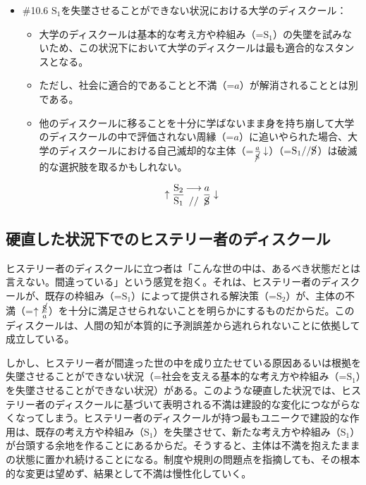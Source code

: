 \begin{note}{}
  \begin{itemize}
    \tightlist
    \item{\#10.6} $\textrm{S}_1$を失墜させることができない状況における大学のディスクール：
      \begin{itemize}
        \tightlist
        \item 大学のディスクールは基本的な考え方や枠組み（=$\textrm{S}_1$）の失墜を試みないため、この状況下において大学のディスクールは最も適合的なスタンスとなる。
        \item ただし、社会に適合的であることと不満（=$a$）が解消されることとは別である。
        \item 他のディスクールに移ることを十分に学ばないまま身を持ち崩して大学のディスクールの中で評価されない周縁（=$a$）に追いやられた場合、大学のディスクールにおける自己滅却的な主体（=$\frac{a}{\cancel{\textrm{S}}}\downarrow$）（=$\textrm{S}_1//\cancel{\textrm{S}}$）は破滅的な選択肢を取るかもしれない。
      \end{itemize}

$$
\uparrow\frac{\mathrm{S_2}}{\mathrm{S_1}}\genfrac{}{}{0pt}{}{\longrightarrow}{//}\frac{a}{\cancel{\textrm{S}}}\downarrow
$$
  \end{itemize}
\end{note}

\subsection{硬直した状況下でのヒステリー者のディスクール}\label{ux786cux76f4ux3057ux305fux72b6ux6cc1ux4e0bux3067ux306eux30d2ux30b9ux30c6ux30eaux30fcux8005ux306eux30c7ux30a3ux30b9ux30afux30fcux30eb}

ヒステリー者のディスクールに立つ者は「こんな世の中は、あるべき状態だとは言えない。間違っている」という感覚を抱く。それは、ヒステリー者のディスクールが、既存の枠組み（=\(\textrm{S}_1\)）によって提供される解決策（=\(\textrm{S}_2\)）が、主体の不満（=\(\uparrow\frac{\cancel{\textrm{S}}}{a}\)）を十分に満足させられないことを明らかにするものだからだ。このディスクールは、人間の知が本質的に予測誤差から逃れられないことに依拠して成立している。

しかし、ヒステリー者が間違った世の中を成り立たせている原因あるいは根拠を失墜させることができない状況（=社会を支える基本的な考え方や枠組み（=\(\textrm{S}_1\)）を失墜させることができない状況）がある。このような硬直した状況では、ヒステリー者のディスクールに基づいて表明される不満は建設的な変化につながらなくなってしまう。ヒステリー者のディスクールが持つ最もユニークで建設的な作用は、既存の考え方や枠組み（\(\textrm{S}_1\)）を失墜させて、新たな考え方や枠組み（\(\textrm{S}_1\)）が台頭する余地を作ることにあるからだ。そうすると、主体は不満を抱えたままの状態に置かれ続けることになる。制度や規則の問題点を指摘しても、その根本的な変更は望めず、結果として不満は慢性化していく。

